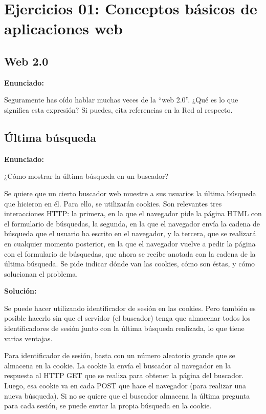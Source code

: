 \section{Ejercicios 01: Conceptos básicos de aplicaciones web}

\subsection{Web 2.0}
\label{subsec:web-20}

\textbf{Enunciado:}

Seguramente has oído hablar muchas veces de la ``web 2.0''. ¿Qué es lo que significa esta expresión? Si puedes, cita referencias en la Red al respecto.

\subsection{Última búsqueda}
\label{subsec:ultima-busqueda}

\textbf{Enunciado:}

¿Cómo mostrar la última búsqueda en un  buscador?

Se quiere que un cierto buscador web muestre a sus usuarios la última búsqueda que hicieron en él. Para ello, se utilizarán cookies. Son relevantes tres interacciones HTTP: la primera, en la que el navegador pide la página HTML con el formulario de búsquedas, la segunda, en la que el navegador envía la cadena de búsqueda que el usuario ha escrito en el navegador, y la tercera, que se realizará en cualquier momento posterior, en la que el navegador vuelve a pedir la página con el formulario de búsquedas, que ahora se recibe anotada con la cadena de la última búsqueda. Se pide indicar dónde van las cookies, cómo son éstas, y cómo solucionan el problema.

\textbf{Solución:}

Se puede hacer utilizando identificador de sesión en las cookies. Pero también es posible hacerlo sin que el servidor (el buscador) tenga que almacenar todos los identificadores de sesión  junto con la última búsqueda realizada, lo que tiene varias ventajas.

Para identificador de sesión, basta con un número aleatorio grande que se almacena en la cookie. La cookie la envía el buscador al navegador en la respuesta al HTTP GET que se realiza para obtener la página del buscador. Luego, esa cookie va en cada POST que hace el navegador (para realizar una nueva búsqueda). Si no se quiere que el buscador almacena la última pregunta para cada sesión, se puede enviar la propia búsqueda en la cookie.   

